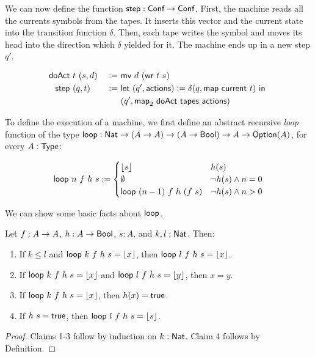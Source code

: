 We can now define the function $\textsf{step} : \textsf{Conf} \rightarrow \textsf{Conf}$.  First, the machine reads all the currents symbols from the tapes.  It inserts this
vector and the current state into the transition function $\delta$.  Then, each tape writes the symbol and moves its head into the direction which
$\delta$ yielded for it.  The machine ends up in a new step $q'$.

\begin{definition}[$\MS{step}$]
  \label{def:step}
  \begin{alignat*}{2}
    \textsf{doAct} &~t~(s, d) &~:=~& \textsf{mv}~d~(\textsf{wr}~t~s) \\
    \textsf{step}  &~(q, t)   &~:=~& \textsf{let}~(q', \textsf{actions}) := \delta(q, \textsf{map}~\textsf{current}~t)~\textsf{in}~ \\
               &          &~  ~& (q', \textsf{map}_2~\textsf{doAct}~\textsf{tapes}~\textsf{actions})
  \end{alignat*}
\end{definition}

To define the execution of a machine, we first define an abstract recursive \emph{loop} function of the type
$\textsf{loop} : \textsf{Nat} \rightarrow (A \rightarrow A) \rightarrow (A \rightarrow \textsf{Bool}) \rightarrow A \rightarrow \textsf{Option}(A)$, for every $A:\textsf{Type}$:

\begin{definition}[$\MS{loop}$]
  \begin{align*}
    \textsf{loop}~n~f~h~s :=
    \begin{cases}
      \left\lfloor {s} \right\rfloor                   & h(s) \\
      \emptyset                      & \lnot h(s) \land n = 0 \\
      \textsf{loop}~(n-1)~f~h~(f~s)  & \lnot h(s) \land n > 0
    \end{cases}
  \end{align*}
\end{definition}

We can show some basic facts about $\MS{loop}$.
\begin{lemma}
  \label{lem:loop}
  Let $f : A \rightarrow A$, $h : A \rightarrow \textsf{Bool}$, $s:A$, and $k, l:\textsf{Nat}$.  Then:
  \begin{enumerate}
  \item \label{lem:loop_ge}
    If $k \le l$ and $\textsf{loop}~k~f~h~s = \left\lfloor {x} \right\rfloor$, then $\textsf{loop}~l~f~h~s = \left\lfloor {x} \right\rfloor$.
  \item \label{lem:loop_injective}
    If $\textsf{loop}~k~f~h~s = \left\lfloor {x} \right\rfloor$ and $\textsf{loop}~l~f~h~s = \left\lfloor {y} \right\rfloor$, then $x = y$.
  \item \label{lem:loop_fulfills_p}
    If $\textsf{loop}~k~f~h~s = \left\lfloor {x} \right\rfloor$, then $h(x) = \textsf{true}$.
  \item \label{lem:loop_fulfills_p_0}
    If $h~s = \textsf{true}$, then $\textsf{loop}~l~f~h~s = \left\lfloor {s} \right\rfloor$.
  \end{enumerate}
\end{lemma}
\begin{proof}
  Claims 1-3 follow by induction on $k:\textsf{Nat}$.  Claim 4 follows by Definition.
\end{proof}


